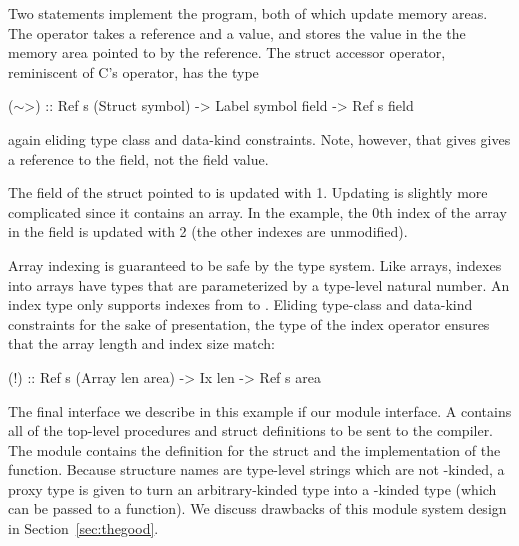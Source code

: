 \newcommand{\mytilde}{\raise.17ex\hbox{$\scriptstyle\mathtt{\sim}$}}

Two statements implement the program, both of which update memory areas.  The
 operator takes a reference and a value, and stores the value in the
the memory area pointed to by the reference.  The struct accessor operator,
reminiscent of C's \cd{->} operator, has the type
\begin{code}
(\(\sim\)>) :: Ref s (Struct symbol)
      -> Label symbol field -> Ref s field
\end{code}
\noindent
again eliding type class and data-kind constraints.  Note, however, that
gives \cd{\mytilde{}>} gives a reference to the field, not the field value.

The  field of the struct pointed to is updated with 1.  Updating
 is slightly more complicated since it contains an array. In
the example, the 0th index of the array in the  field is updated with 2
(the other indexes are unmodified).

Array indexing is guaranteed to be safe by the type system.  Like arrays,
indexes into arrays have types that are parameterized by a type-level natural
number.  An index type  only supports indexes from  to .
Eliding type-class and data-kind constraints for the sake of presentation, the
type of the index operator ensures that the array length and index size match:
\begin{code}
(!) :: Ref s (Array len area) -> Ix len -> Ref s area
\end{code}

The final interface we describe in this example if our module interface.
A  contains all of the top-level procedures and struct definitions to
be sent to the compiler.  The module  contains the definition
for the struct and the implementation of the function.  Because structure names
are type-level strings which are not \cd{*}-kinded, a proxy type is given to
turn an arbitrary-kinded type into a \cd{*}-kinded type (which can be passed to
a function). We discuss drawbacks of this module system design in
Section~\ref{sec:thegood}.



